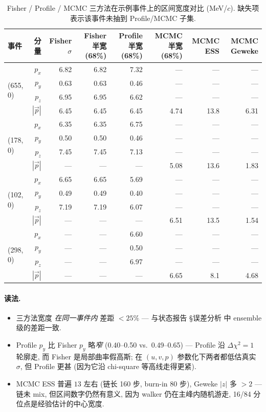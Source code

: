 \begin{table}[H]
\centering\scriptsize
\caption{Fisher / Profile / MCMC 三方法在示例事件上的区间宽度对比 (MeV/$c$). 缺失项表示该事件未抽到 Profile/MCMC 子集.}
\label{tab:partIII:case_methods_comparison}
\begin{tabular}{lrrrrrrr}
\toprule
事件 & 分量 & Fisher $\sigma$ & Fisher 半宽(68\%) & Profile 半宽(68\%) & MCMC 半宽(68\%) & MCMC ESS & MCMC Geweke \\
\midrule
\multirow{4}{*}{(655, 0)}
 & $p_x$ & 6.82 & 6.82 & 7.32 & --- & --- & --- \\
 & $p_y$ & 0.63 & 0.63 & 0.46 & --- & --- & --- \\
 & $p_z$ & 6.95 & 6.95 & 6.62 & --- & --- & --- \\
 & $|\vec p|$ & 6.45 & 6.45 & 6.45 & 4.74 & 13.8 & 6.31 \\
\midrule
\multirow{4}{*}{(178, 0)}
 & $p_x$ & 6.35 & 6.35 & 6.75 & --- & --- & --- \\
 & $p_y$ & 0.50 & 0.50 & 0.46 & --- & --- & --- \\
 & $p_z$ & 7.45 & 7.45 & 7.13 & --- & --- & --- \\
 & $|\vec p|$ & --- & --- & --- & 5.08 & 13.6 & 1.83 \\
\midrule
\multirow{4}{*}{(102, 0)}
 & $p_x$ & 6.65 & 6.65 & 5.69 & --- & --- & --- \\
 & $p_y$ & 0.49 & 0.49 & 0.40 & --- & --- & --- \\
 & $p_z$ & 7.19 & 7.19 & 6.07 & --- & --- & --- \\
 & $|\vec p|$ & --- & --- & --- & 6.51 & 13.5 & 1.54 \\
\midrule
\multirow{4}{*}{(298, 0)}
 & $p_x$ & --- & --- & 6.60 & --- & --- & --- \\
 & $p_y$ & --- & --- & 0.50 & --- & --- & --- \\
 & $p_z$ & --- & --- & 6.97 & --- & --- & --- \\
 & $|\vec p|$ & --- & --- & --- & 6.65 & 8.1 & 4.68 \\
\bottomrule
\end{tabular}
\end{table}

\paragraph{读法.}
\begin{itemize}[nosep]
  \item 三方法宽度 \emph{在同一事件内} 差距 $< 25\%$ — 与状态报告 §误差分析 中 ensemble 级的差距一致.
  \item Profile $p_y$ 比 Fisher $p_y$ 略\emph{窄} (0.40--0.50 vs.\ 0.49--0.65) — Profile 沿 $\Delta\chi^2 = 1$ 轮廓走, 而 Fisher 是局部曲率假高斯; 在 $(u,v,p)$ 参数化下两者都低估真实 $\sigma$, 但 Profile 更甚 (因为它沿 chi-square 等高线走得更紧).
  \item MCMC ESS 普遍 $13$ 左右 (链长 160 步, burn-in 80 步), Geweke $|z|$ 多 $> 2$ — 链未 mix, 但区间数字仍然有意义, 因为 walker 仍在主峰内随机游走, 16/84 分位点是经验估计的中心宽度.
\end{itemize}

